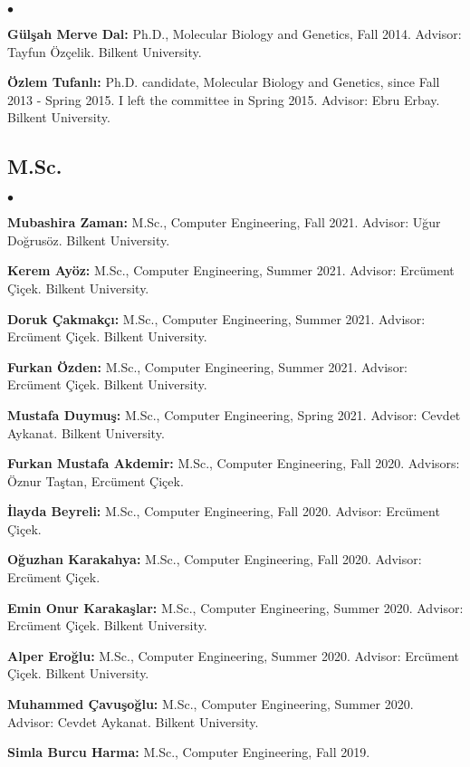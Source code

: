 \documentclass[margin,line]{res}
\newenvironment{list2}{
  \begin{list}{$\bullet$}{%
      \setlength{\itemsep}{0.1cm}
      \setlength{\parsep}{0in} \setlength{\parskip}{0in}
      \setlength{\topsep}{0in} \setlength{\partopsep}{0in} 
      \setlength{\leftmargin}{0.2in}}}{\end{list}}
\begin{document}
\begin{resume}
\begin{list2}
\item
  {\bf G\"{u}l\c{s}ah Merve Dal:} Ph.D., Molecular Biology and Genetics, Fall 2014.
  Advisor: Tayfun Özçelik.
  Bilkent University. 
\item
  {\bf Özlem Tufanlı:} Ph.D. candidate, Molecular Biology and Genetics, since Fall 2013 - Spring 2015. I left the committee in Spring 2015.
  Advisor: Ebru Erbay.
  Bilkent University.
  \end{list2}

\vspace*{-.4cm}
\subsection{\small \sc M.Sc.}
\begin{list2}
\item
{\bf Mubashira Zaman:} M.Sc., Computer Engineering, Fall 2021.
  Advisor: Uğur Doğrusöz.
  Bilkent University.
\item
{\bf  Kerem Ayöz:} M.Sc., Computer Engineering, Summer 2021.
  Advisor: Ercüment Çiçek.
  Bilkent University.
\item
{\bf  Doruk Çakmakçı:} M.Sc., Computer Engineering, Summer 2021.
  Advisor: Ercüment Çiçek.
  Bilkent University.
\item
{\bf  Furkan Özden:} M.Sc., Computer Engineering, Summer 2021.
  Advisor: Ercüment Çiçek.
  Bilkent University.
\item
{\bf  Mustafa Duymuş:} M.Sc., Computer Engineering, Spring 2021.
  Advisor: Cevdet Aykanat.
  Bilkent University.
\item 
{\bf Furkan Mustafa Akdemir:} M.Sc., Computer Engineering, Fall 2020.
  Advisors:  Öznur Taştan, Ercüment Çiçek.
\item 
{\bf İlayda Beyreli:} M.Sc., Computer Engineering, Fall 2020.
  Advisor:  Ercüment Çiçek.
\item 
{\bf Oğuzhan Karakahya:} M.Sc., Computer Engineering, Fall 2020.
  Advisor:  Ercüment Çiçek.
\item 
{\bf  Emin Onur Karakaşlar:} M.Sc., Computer Engineering, Summer 2020.
  Advisor:  Ercüment Çiçek.
  Bilkent University.\item 
{\bf  Alper Eroğlu:} M.Sc., Computer Engineering, Summer 2020.
  Advisor:  Ercüment Çiçek.
  Bilkent University.
  \item
{\bf  Muhammed Çavuşoğlu:} M.Sc., Computer Engineering, Summer 2020.
  Advisor: Cevdet Aykanat.
  Bilkent University.
\item
{\bf  Simla Burcu Harma:} M.Sc., Computer Engineering, Fall 2019.

\end{list2}
\end{resume}
\end{document}
